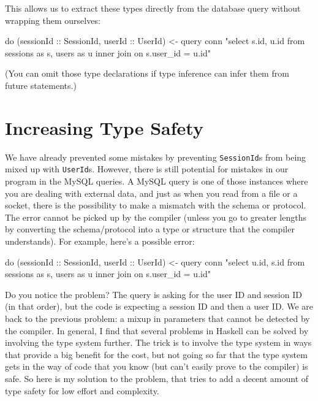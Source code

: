 \documentclass{tmr}
\begin{document}
This allows us to extract these types directly from the database query without wrapping them ourselves:

\begin{code}
do (sessionId :: SessionId, userId :: UserId) <- query conn "select
     s.id, u.id from sessions as s, users as u inner join on s.user_id = u.id"
\end{code}

(You can omit those type declarations if type inference can infer them from future statements.)

\section{Increasing Type Safety}

We have already prevented some mistakes by preventing \lstinline|SessionId|s from being mixed up with \lstinline|UserId|s.  However, there is still potential for mistakes in our program in the MySQL queries.  A MySQL query is one of those instances where you are dealing with external data, and just as when you read from a file or a socket, there is the possibility to make a mismatch with the schema or protocol.  The error cannot be picked up by the compiler (unless you go to greater lengths by converting the schema/protocol into a type or structure that the compiler understands).  For example, here's a possible error:

\begin{code}
do (sessionId :: SessionId, userId :: UserId) <- query conn "select
     u.id, s.id from sessions as s, users as u inner join on s.user_id = u.id"
\end{code}

Do you notice the problem?  The query is asking for the user ID and session ID (in that order), but the code is expecting a session ID and then a user ID\@.  We are back to the previous problem: a mixup in parameters that cannot be detected by the compiler.  In general, I find that several problems in Haskell can be solved by involving the type system further.  The trick is to involve the type system in ways that provide a big benefit for the cost, but not going so far that the type system gets in the way of code that you know (but can't easily prove to the compiler) is safe.   So here is my solution to the problem, that tries to add a decent amount of type safety for low effort and complexity.
\end{document}
